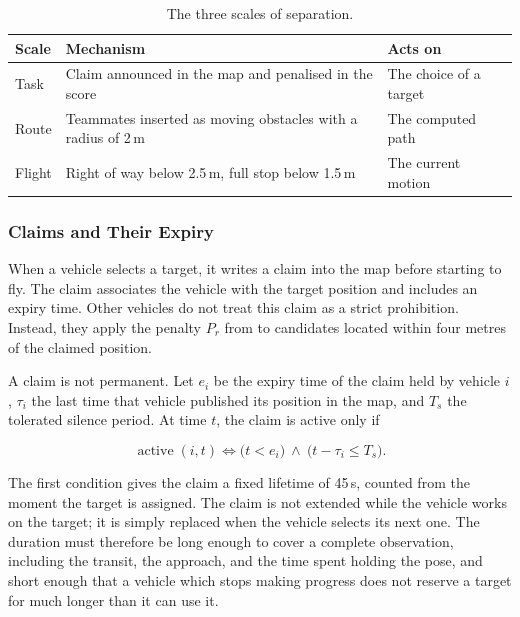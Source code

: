 \begin{table}[!htb]
    \centering
    \caption{The three scales of separation.}%
    \label{tab:sys:separation}
    \setlength{\tabcolsep}{4pt}
    \begin{tabular}{@{}>{\raggedright\arraybackslash}p{2.2cm}
            >{\raggedright\arraybackslash}p{7.4cm}
            >{\raggedright\arraybackslash}p{4.8cm}@{}}
        \toprule
        \textbf{Scale} & \textbf{Mechanism}                                            & \textbf{Acts on}        \\
        \midrule
        Task           & Claim announced in the map and penalised in the score          & The choice of a target  \\
        \addlinespace
        Route          & Teammates inserted as moving obstacles with a radius of 2\,m  & The computed path       \\
        \addlinespace
        Flight         & Right of way below 2.5\,m, full stop below 1.5\,m             & The current motion      \\
        \bottomrule
    \end{tabular}
\end{table}

\FloatBarrier

\subsubsection*{Claims and Their Expiry}

When a vehicle selects a target, it writes a claim into the map before starting
to fly. The claim associates the vehicle with the target position and includes an
expiry time. Other vehicles do not treat this claim as a strict prohibition.
Instead, they apply the penalty $P_r$ from  to candidates
located within four metres of the claimed position.

A claim is not permanent. Let $e_i$ be the expiry time of the claim held by
vehicle $i$, $\tau_i$ the last time that vehicle published its position in the
map, and $T_s$ the tolerated silence period. At time $t$, the claim is active
only if

\begin{equation}
    \operatorname{active}(i,t)
    \iff
    \bigl(t < e_i\bigr)
    \ \wedge\
    \bigl(t-\tau_i \leq T_s\bigr).
    \label{eq:sys:claim-active}
\end{equation}

The first condition gives the claim a fixed lifetime of 45\,s, counted from the
moment the target is assigned. The claim is not extended while the vehicle works
on the target; it is simply replaced when the vehicle selects its next one. The
duration must therefore be long enough to cover a complete observation, including
the transit, the approach, and the time spent holding the pose, and short enough
that a vehicle which stops making progress does not reserve a target for much
longer than it can use it.

